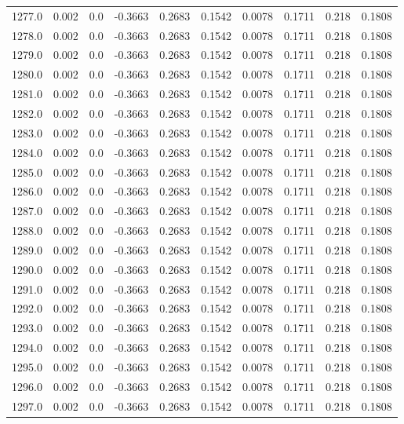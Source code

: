 \begin{longtable}{lrrrrrrrrr}
1277.0 & 0.002 & 0.0 & -0.3663 & 0.2683 & 0.1542 & 0.0078 & 0.1711 & 0.218 & 0.1808 \\
1278.0 & 0.002 & 0.0 & -0.3663 & 0.2683 & 0.1542 & 0.0078 & 0.1711 & 0.218 & 0.1808 \\
1279.0 & 0.002 & 0.0 & -0.3663 & 0.2683 & 0.1542 & 0.0078 & 0.1711 & 0.218 & 0.1808 \\
1280.0 & 0.002 & 0.0 & -0.3663 & 0.2683 & 0.1542 & 0.0078 & 0.1711 & 0.218 & 0.1808 \\
1281.0 & 0.002 & 0.0 & -0.3663 & 0.2683 & 0.1542 & 0.0078 & 0.1711 & 0.218 & 0.1808 \\
1282.0 & 0.002 & 0.0 & -0.3663 & 0.2683 & 0.1542 & 0.0078 & 0.1711 & 0.218 & 0.1808 \\
1283.0 & 0.002 & 0.0 & -0.3663 & 0.2683 & 0.1542 & 0.0078 & 0.1711 & 0.218 & 0.1808 \\
1284.0 & 0.002 & 0.0 & -0.3663 & 0.2683 & 0.1542 & 0.0078 & 0.1711 & 0.218 & 0.1808 \\
1285.0 & 0.002 & 0.0 & -0.3663 & 0.2683 & 0.1542 & 0.0078 & 0.1711 & 0.218 & 0.1808 \\
1286.0 & 0.002 & 0.0 & -0.3663 & 0.2683 & 0.1542 & 0.0078 & 0.1711 & 0.218 & 0.1808 \\
1287.0 & 0.002 & 0.0 & -0.3663 & 0.2683 & 0.1542 & 0.0078 & 0.1711 & 0.218 & 0.1808 \\
1288.0 & 0.002 & 0.0 & -0.3663 & 0.2683 & 0.1542 & 0.0078 & 0.1711 & 0.218 & 0.1808 \\
1289.0 & 0.002 & 0.0 & -0.3663 & 0.2683 & 0.1542 & 0.0078 & 0.1711 & 0.218 & 0.1808 \\
1290.0 & 0.002 & 0.0 & -0.3663 & 0.2683 & 0.1542 & 0.0078 & 0.1711 & 0.218 & 0.1808 \\
1291.0 & 0.002 & 0.0 & -0.3663 & 0.2683 & 0.1542 & 0.0078 & 0.1711 & 0.218 & 0.1808 \\
1292.0 & 0.002 & 0.0 & -0.3663 & 0.2683 & 0.1542 & 0.0078 & 0.1711 & 0.218 & 0.1808 \\
1293.0 & 0.002 & 0.0 & -0.3663 & 0.2683 & 0.1542 & 0.0078 & 0.1711 & 0.218 & 0.1808 \\
1294.0 & 0.002 & 0.0 & -0.3663 & 0.2683 & 0.1542 & 0.0078 & 0.1711 & 0.218 & 0.1808 \\
1295.0 & 0.002 & 0.0 & -0.3663 & 0.2683 & 0.1542 & 0.0078 & 0.1711 & 0.218 & 0.1808 \\
1296.0 & 0.002 & 0.0 & -0.3663 & 0.2683 & 0.1542 & 0.0078 & 0.1711 & 0.218 & 0.1808 \\
1297.0 & 0.002 & 0.0 & -0.3663 & 0.2683 & 0.1542 & 0.0078 & 0.1711 & 0.218 & 0.1808 \\

\end{longtable}
